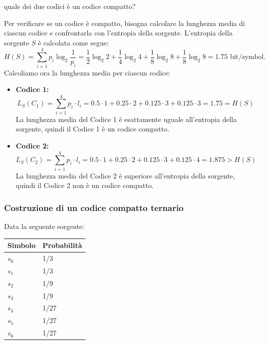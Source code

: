 \documentclass{article}
\theoremstyle{definition}
\numberwithin{equation}{section}
\begin{document}
quale dei due codici è un codice compatto?

Per verificare se un codice è compatto, bisogna calcolare la lunghezza media di ciascun codice e confrontarla con l'entropia della sorgente. L'entropia della sorgente $S$ è calcolata come segue:
\[
    H(S) = \sum_{i=1}^4 p_i \log_2 \frac{1}{p_i} = \frac{1}{2}\log_2 2 + \frac{1}{4}\log_2 4 + \frac{1}{8}\log_2 8 + \frac{1}{8}\log_2 8 = 1.75 \text{ bit/symbol}.
\]
Calcoliamo ora la lunghezza media per ciascun codice:
\begin{itemize}
    \item \textbf{Codice 1:}
          \[
              L_S(C_1) = \sum_{i=1}^4 p_i \cdot l_i = 0.5\cdot 1 + 0.25\cdot 2 + 0.125\cdot 3 + 0.125\cdot 3 = 1.75 = H(S)
          \]
          La lunghezza media del Codice 1 è esattamente uguale all'entropia della sorgente, quindi il Codice 1 è un codice compatto.
    \item \textbf{Codice 2:}
          \[
              L_S(C_2) = \sum_{i=1}^4 p_i \cdot l_i = 0.5\cdot 1 + 0.25\cdot 2 + 0.125\cdot 3 + 0.125\cdot 4 = 1.875 > H(S)
          \]
          La lunghezza media del Codice 2 è superiore all'entropia della sorgente, quindi il Codice 2 non è un codice compatto.
\end{itemize}
\newpage
\subsubsection{Costruzione di un codice compatto ternario}
Data la seguente sorgente:
\begin{table}[htpb]
    \centering
    \begin{tabular}{|l|l|}
        \hline
        \textbf{Simbolo} & \textbf{Probabilità} \\ \hline
        $s_0$            & 1/3                  \\ \hline
        $s_1$            & 1/3                  \\ \hline
        $s_2$            & 1/9                  \\ \hline
        $s_3$            & 1/9                  \\ \hline
        $s_4$            & 1/27                 \\ \hline
        $s_5$            & 1/27                 \\ \hline
        $s_6$            & 1/27                 \\ \hline
    \end{tabular}
\end{table}
\end{document}
